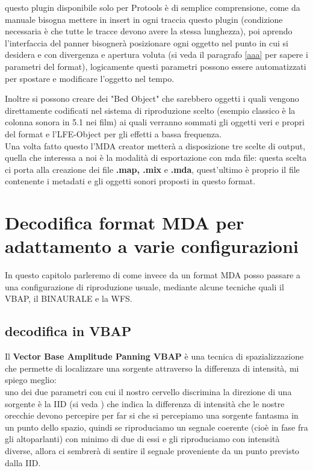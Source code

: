 \documentclass[12pt,a4paper]{report}
\begin{document}
questo plugin disponibile solo per Protools è di semplice comprensione, come da manuale bisogna mettere in insert in ogni traccia questo plugin (condizione necessaria è che tutte le tracce devono avere la stessa lunghezza), poi aprendo l'interfaccia del panner bisognerà posizionare ogni oggetto nel punto in cui si desidera e con divergenza e apertura voluta (si veda il paragrafo \ref{aaa} per sapere i parametri del format), logicamente questi parametri possono essere automatizzati per spostare e modificare l'oggetto nel tempo.

Inoltre si possono creare dei "Bed Object" che sarebbero oggetti i quali vengono direttamente codificati nel sistema di riproduzione scelto (esempio classico è la colonna sonora in 5.1 nei film) ai quali verranno sommati gli oggetti veri e propri del format e l'LFE-Object per gli effetti a bassa frequenza.\\

Una volta fatto questo l'MDA creator metterà a disposizione tre scelte di output, quella che interessa a noi è la modalità di esportazione con mda file: questa scelta ci porta alla creazione dei file \textbf{.map, .mix} e \textbf{.mda}, quest'ultimo è proprio il file contenente i metadati e gli oggetti sonori proposti in questo format.


\chapter{Decodifica format MDA per adattamento a varie configurazioni}

In questo capitolo parleremo di come invece da un format MDA posso passare a una configurazione di riproduzione usuale, mediante alcune tecniche quali il VBAP, il BINAURALE e la WFS.\\

\section{decodifica in VBAP}

Il \textbf{Vector Base Amplitude Panning VBAP} è una tecnica di spazializzazione che permette di localizzare una sorgente attraverso la differenza di intensità, mi spiego meglio:\\
uno dei due parametri con cui il nostro cervello discrimina la direzione di una sorgente è la IID (si veda \cite{iid}) che indica la differenza di intensità che le nostre orecchie devono percepire per far si che si percepiamo una sorgente fantasma in un punto dello spazio, quindi se riproduciamo un segnale coerente (cioè in fase fra gli altoparlanti) con minimo di due di essi e gli riproduciamo con intensità diverse, allora ci sembrerà di sentire il segnale proveniente da un punto previsto dalla IID.\\
\end{document}
